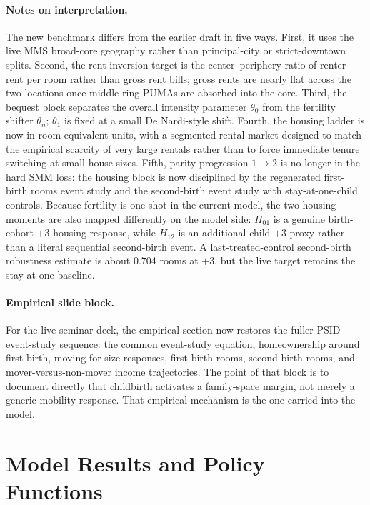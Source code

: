 \documentclass[11pt]{article}
\begin{document}
\paragraph{Notes on interpretation.}
The new benchmark differs from the earlier draft in five ways. First, it uses the live MMS broad-core geography rather than principal-city or strict-downtown splits. Second, the rent inversion target is the center--periphery ratio of renter rent per room rather than gross rent bills; gross rents are nearly flat across the two locations once middle-ring PUMAs are absorbed into the core. Third, the bequest block separates the overall intensity parameter $\theta_0$ from the fertility shifter $\theta_n$; $\theta_1$ is fixed at a small De Nardi-style shift. Fourth, the housing ladder is now in room-equivalent units, with a segmented rental market designed to match the empirical scarcity of very large rentals rather than to force immediate tenure switching at small house sizes. Fifth, parity progression $1 \to 2$ is no longer in the hard SMM loss: the housing block is now disciplined by the regenerated first-birth rooms event study and the second-birth event study with stay-at-one-child controls. Because fertility is one-shot in the current model, the two housing moments are also mapped differently on the model side: $H_{01}$ is a genuine birth-cohort $+3$ housing response, while $H_{12}$ is an additional-child $+3$ proxy rather than a literal sequential second-birth event. A last-treated-control second-birth robustness estimate is about 0.704 rooms at $+3$, but the live target remains the stay-at-one baseline.

\paragraph{Empirical slide block.}
For the live seminar deck, the empirical section now restores the fuller PSID event-study sequence: the common event-study equation, homeownership around first birth, moving-for-size responses, first-birth rooms, second-birth rooms, and mover-versus-non-mover income trajectories. The point of that block is to document directly that childbirth activates a family-space margin, not merely a generic mobility response. That empirical mechanism is the one carried into the model.

\clearpage
\section{Model Results and Policy Functions}
\label{sec:results}
\end{document}
